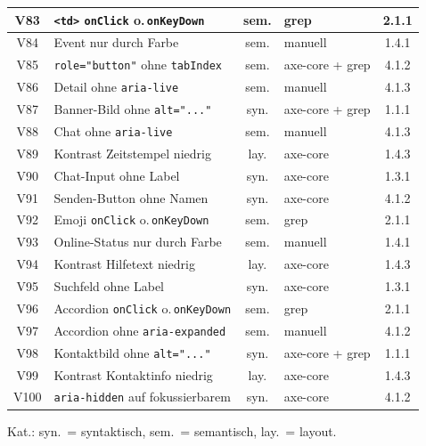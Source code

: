\begin{longtable}{|c|p{5.8cm}|c|p{3.6cm}|c|}
V83  & \texttt{<td>} \texttt{onClick} o.\,\texttt{onKeyDown} & sem. & grep    & 2.1.1 \\ \hline
V84  & Event nur durch Farbe                     & sem. & manuell                 & 1.4.1 \\ \hline
V85  & \texttt{role="button"} ohne \texttt{tabIndex} & sem. & axe-core + grep  & 4.1.2 \\ \hline
V86  & Detail ohne \texttt{aria-live}            & sem. & manuell                 & 4.1.3 \\ \hline
V87  & Banner-Bild ohne \texttt{alt="..."}             & syn. & axe-core + grep         & 1.1.1 \\ \hline
V88  & Chat ohne \texttt{aria-live}              & sem. & manuell                 & 4.1.3 \\ \hline
V89  & Kontrast Zeitstempel niedrig              & lay. & axe-core                & 1.4.3 \\ \hline
V90  & Chat-Input ohne Label                     & syn. & axe-core                & 1.3.1 \\ \hline
V91  & Senden-Button ohne Namen                  & syn. & axe-core                & 4.1.2 \\ \hline
V92  & Emoji \texttt{onClick} o.\,\texttt{onKeyDown} & sem. & grep            & 2.1.1 \\ \hline
V93  & Online-Status nur durch Farbe             & sem. & manuell                 & 1.4.1 \\ \hline
V94  & Kontrast Hilfetext niedrig                & lay. & axe-core                & 1.4.3 \\ \hline
V95  & Suchfeld ohne Label                       & syn. & axe-core                & 1.3.1 \\ \hline
V96  & Accordion \texttt{onClick} o.\,\texttt{onKeyDown} & sem. & grep       & 2.1.1 \\ \hline
V97  & Accordion ohne \texttt{aria-expanded}     & sem. & manuell                 & 4.1.2 \\ \hline
V98  & Kontaktbild ohne \texttt{alt="..."}             & syn. & axe-core + grep         & 1.1.1 \\ \hline
V99  & Kontrast Kontaktinfo niedrig              & lay. & axe-core                & 1.4.3 \\ \hline
V100 & \texttt{aria-hidden} auf fokussierbarem   & syn. & axe-core                & 4.1.2 \\ \hline
\end{longtable}
\begin{center}\footnotesize Kat.: syn.\ = syntaktisch, sem.\ = semantisch, lay.\ = layout.\end{center}

